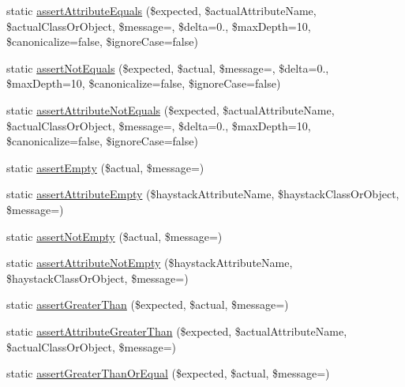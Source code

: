 \begin{DoxyCompactItemize}
static \mbox{\hyperlink{class_p_h_p_unit___framework___assert_ab59bf0769fea4609a5cec0f6ef6c1bc7}{assert\+Attribute\+Equals}} (\$expected, \$actual\+Attribute\+Name, \$actual\+Class\+Or\+Object, \$message=\textquotesingle{}\textquotesingle{}, \$delta=0., \$max\+Depth=10, \$canonicalize=false, \$ignore\+Case=false)
\item 
static \mbox{\hyperlink{class_p_h_p_unit___framework___assert_a681e011ec7345de7de58a494fd624ae8}{assert\+Not\+Equals}} (\$expected, \$actual, \$message=\textquotesingle{}\textquotesingle{}, \$delta=0., \$max\+Depth=10, \$canonicalize=false, \$ignore\+Case=false)
\item 
static \mbox{\hyperlink{class_p_h_p_unit___framework___assert_a1e6cb79632d549fab2b52aaf4b905238}{assert\+Attribute\+Not\+Equals}} (\$expected, \$actual\+Attribute\+Name, \$actual\+Class\+Or\+Object, \$message=\textquotesingle{}\textquotesingle{}, \$delta=0., \$max\+Depth=10, \$canonicalize=false, \$ignore\+Case=false)
\item 
static \mbox{\hyperlink{class_p_h_p_unit___framework___assert_a4274411038b63d6065cf2a3480ba1eb9}{assert\+Empty}} (\$actual, \$message=\textquotesingle{}\textquotesingle{})
\item 
static \mbox{\hyperlink{class_p_h_p_unit___framework___assert_aeebc2e8b0588e618067b2253ff303730}{assert\+Attribute\+Empty}} (\$haystack\+Attribute\+Name, \$haystack\+Class\+Or\+Object, \$message=\textquotesingle{}\textquotesingle{})
\item 
static \mbox{\hyperlink{class_p_h_p_unit___framework___assert_a5f3ecf4f2cccd70045d878b38134a952}{assert\+Not\+Empty}} (\$actual, \$message=\textquotesingle{}\textquotesingle{})
\item 
static \mbox{\hyperlink{class_p_h_p_unit___framework___assert_a056aabfaca0673148db3e92ee35a1bb2}{assert\+Attribute\+Not\+Empty}} (\$haystack\+Attribute\+Name, \$haystack\+Class\+Or\+Object, \$message=\textquotesingle{}\textquotesingle{})
\item 
static \mbox{\hyperlink{class_p_h_p_unit___framework___assert_a91e62fc429ff2e4b3717c07b372452f4}{assert\+Greater\+Than}} (\$expected, \$actual, \$message=\textquotesingle{}\textquotesingle{})
\item 
static \mbox{\hyperlink{class_p_h_p_unit___framework___assert_a2fd4571bd5cc6e6d36677d6fc01635cc}{assert\+Attribute\+Greater\+Than}} (\$expected, \$actual\+Attribute\+Name, \$actual\+Class\+Or\+Object, \$message=\textquotesingle{}\textquotesingle{})
\item 
static \mbox{\hyperlink{class_p_h_p_unit___framework___assert_af6018b318f4beee280d0d823e75112f4}{assert\+Greater\+Than\+Or\+Equal}} (\$expected, \$actual, \$message=\textquotesingle{}\textquotesingle{})

\end{DoxyCompactItemize}
